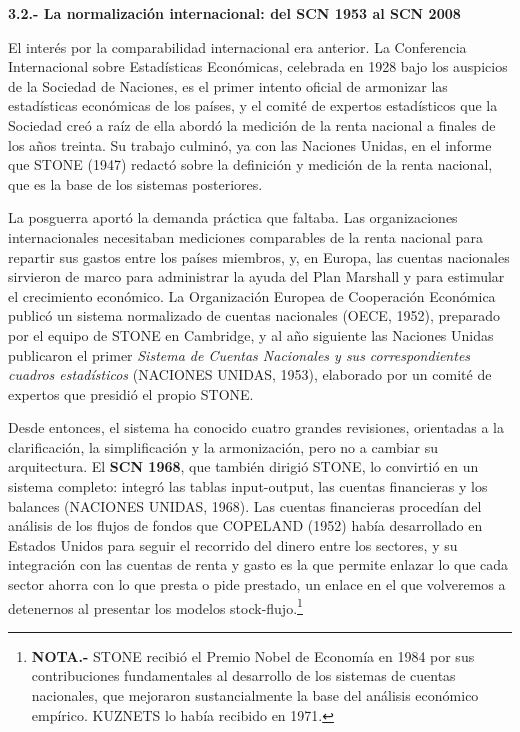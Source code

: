 \documentclass[10pt,a4paper]{article}
\begin{document}
\textbf{3.2.- La normalización internacional: del SCN 1953 al SCN 2008}

El interés por la comparabilidad internacional era anterior. La Conferencia Internacional sobre Estadísticas Económicas, celebrada en 1928 bajo los auspicios de la Sociedad de Naciones, es el primer intento oficial de armonizar las estadísticas económicas de los países, y el comité de expertos estadísticos que la Sociedad creó a raíz de ella abordó la medición de la renta nacional a finales de los años treinta. Su trabajo culminó, ya con las Naciones Unidas, en el informe que STONE (1947) redactó sobre la definición y medición de la renta nacional, que es la base de los sistemas posteriores.

La posguerra aportó la demanda práctica que faltaba. Las organizaciones internacionales necesitaban mediciones comparables de la renta nacional para repartir sus gastos entre los países miembros, y, en Europa, las cuentas nacionales sirvieron de marco para administrar la ayuda del Plan Marshall y para estimular el crecimiento económico. La Organización Europea de Cooperación Económica publicó un sistema normalizado de cuentas nacionales (OECE, 1952), preparado por el equipo de STONE en Cambridge, y al año siguiente las Naciones Unidas publicaron el primer \textit{Sistema de Cuentas Nacionales y sus correspondientes cuadros estadísticos} (NACIONES UNIDAS, 1953), elaborado por un comité de expertos que presidió el propio STONE.

Desde entonces, el sistema ha conocido cuatro grandes revisiones, orientadas a la clarificación, la simplificación y la armonización, pero no a cambiar su arquitectura. El \textbf{SCN 1968}, que también dirigió STONE, lo convirtió en un sistema completo: integró las tablas input-output, las cuentas financieras y los balances (NACIONES UNIDAS, 1968). Las cuentas financieras procedían del análisis de los flujos de fondos que COPELAND (1952) había desarrollado en Estados Unidos para seguir el recorrido del dinero entre los sectores, y su integración con las cuentas de renta y gasto es la que permite enlazar lo que cada sector ahorra con lo que presta o pide prestado, un enlace en el que volveremos a detenernos al presentar los modelos stock-flujo.\footnote{%
    \textbf{NOTA.-} STONE recibió el Premio Nobel de Economía en 1984 por sus contribuciones fundamentales al desarrollo de los sistemas de cuentas nacionales, que mejoraron sustancialmente la base del análisis económico empírico. KUZNETS lo había recibido en 1971.
} 
\end{document}
